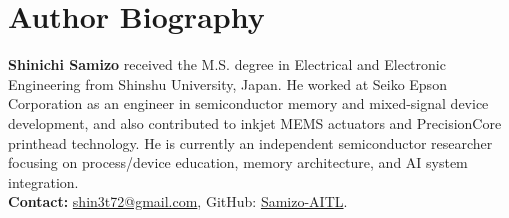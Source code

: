 \documentclass[conference]{IEEEtran}
\begin{document}
\section*{Author Biography}
\noindent\textbf{Shinichi Samizo}
received the M.S. degree in Electrical and Electronic Engineering from Shinshu University, Japan.
He worked at Seiko Epson Corporation as an engineer in semiconductor memory and mixed-signal device development, and also contributed to inkjet MEMS actuators and PrecisionCore printhead technology.
He is currently an independent semiconductor researcher focusing on process/device education, memory architecture, and AI system integration. \\
\textbf{Contact:} \href{mailto:shin3t72@gmail.com}{shin3t72@gmail.com}, GitHub: \href{https://github.com/Samizo-AITL}{Samizo-AITL}.
\end{document}
